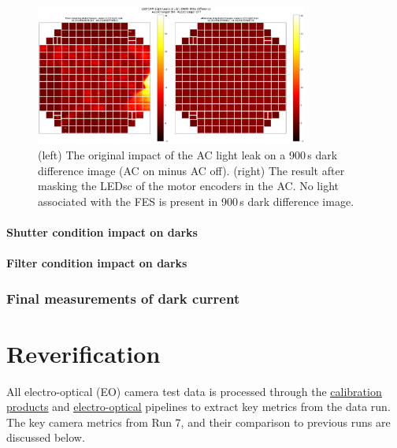 \begin{figure}
\begin{centering}
\includegraphics[width=0.8\textwidth]{sections/figures/AC_LightLeak_study.png}
\caption{ (left) The original impact of the AC light leak on a 900\,s dark difference image (AC on minus AC off). (right) The result after masking the LEDsc of the motor encoders in the AC.  No light associated with the FES is present in 900\,s dark difference image.  \label{fig:ac-light-leak}}
\end{centering}
\end{figure}

\paragraph{Shutter condition impact on
darks}\label{shutter-condition-impact-on-darks}

\paragraph{Filter condition impact on
darks}\label{filter-condition-impact-on-darks}

\subsubsection{Final measurements of dark
current}\label{final-measurements-of-dark-current}

\section{Reverification}\label{reverification}

All electro-optical (EO) camera test data is processed through the
\underline{\href{https://github.com/lsst/cp_pipe/tree/main}{calibration products}} and
\underline{\href{https://github.com/lsst-camera-dh/eo_pipe/tree/main}{electro-optical}}
pipelines to extract key metrics from the data run. The key camera
metrics from Run 7, and their comparison to previous runs are discussed
below.

